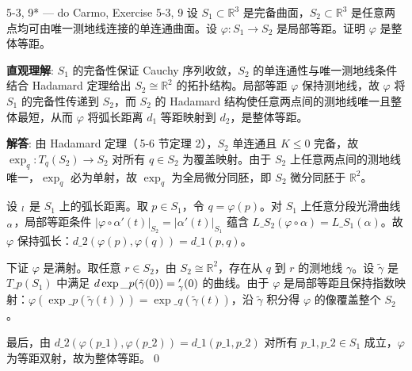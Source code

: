 \begin{exercise}{5-3, 9* — do Carmo, Exercise 5-3, 9}
设 $S_1 \subset \mathbb{R}^3$ 是完备曲面，$S_2 \subset \mathbb{R}^3$ 是任意两点均可由唯一测地线连接的单连通曲面。设 $\varphi: S_1 \to S_2$ 是局部等距。证明 $\varphi$ 是整体等距。
\end{exercise}
\begin{solution}
\textbf{直观理解}: $S_1$ 的完备性保证 Cauchy 序列收敛，$S_2$ 的单连通性与唯一测地线条件结合 Hadamard 定理给出 $S_2\cong\mathbb{R}^2$ 的拓扑结构。局部等距 $\varphi$ 保持测地线，故 $\varphi$ 将 $S_1$ 的完备性传递到 $S_2$，而 $S_2$ 的 Hadamard 结构使任意两点间的测地线唯一且整体最短，从而 $\varphi$ 将弧长距离 $d_1$ 等距映射到 $d_2$，是整体等距。

\textbf{解答}: 由 Hadamard 定理（\,5-6 节定理 2），$S_2$ 单连通且 $K\leq0$ 完备，故 $\exp_{q}:T_{q}(S_2)\to S_2$ 对所有 $q\in S_2$ 为覆盖映射。由于 $S_2$ 上任意两点间的测地线唯一，$\exp_q$ 必为单射，故 $\exp_q$ 为全局微分同胚，即 $S_2$ 微分同胚于 $\mathbb{R}^2$。

设 $\\_l$ 是 $S_1$ 上的弧长距离。取 $p\in S_1$，令 $q=\varphi(p)$。对 $S_1$ 上任意分段光滑曲线 $\\_\alpha$，局部等距条件 $|\varphi\circ\alpha'(t)|_{S_2}=|\alpha'(t)|_{S_1}$ 蕴含 $L\_{S_2}(\varphi\circ\alpha)=L\_{S_1}(\alpha)$。故 $\varphi$ 保持弧长：$d\_2(\varphi(p),\varphi(q))=d\_1(p,q)$。

下证 $\varphi$ 是满射。取任意 $r\in S_2$，由 $S_2\cong\mathbb{R}^2$，存在从 $q$ 到 $r$ 的测地线 $\gamma$。设 $\tilde{\gamma}$ 是 $T\_{p}(S_1)$ 中满足 $d\exp\_{p}(\tilde{\gamma}(0))=\\_\gamma'(0)$ 的曲线。由于 $\varphi$ 是局部等距且保持指数映射：$\varphi(\exp\_p(\tilde{\gamma}(t)))=\exp\_{q}(\tilde{\gamma}(t))$，沿 $\tilde{\gamma}$ 积分得 $\varphi$ 的像覆盖整个 $S_2$。

最后，由 $d\_2(\varphi(p\_1),\varphi(p\_2))=d\_1(p\_1,p\_2)$ 对所有 $p\_1,p\_2\in S_1$ 成立，$\varphi$ 为等距双射，故为整体等距。\qed
\end{solution}

